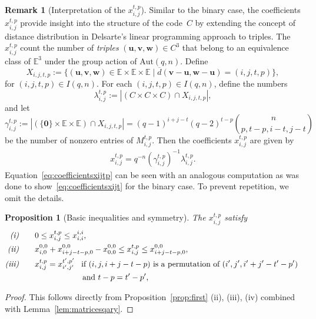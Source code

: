 \documentclass[10pt,a4paper]{article}
\newcommand{\E}{\mathbb{E}}
\newtheorem{proposition}[theorem]{Proposition}
\theoremstyle{definition}
\newtheorem{remark}{Remark}[section]
\newcommand{\uu}{\mathbf{u}}
\newcommand{\vv}{\mathbf{v}}
\newcommand{\ww}{\mathbf{w}}
\begin{document}
\begin{remark}[Interpretation of the $x_{i,j}^{t,p}$]
Similar to the binary case, the coefficients $x_{i,j}^{t,p}$ provide insight into the structure of the code~$C$ by extending the concept of distance distribution in Delsarte's linear programming approach to triples.  The $x_{i,j}^{t,p}$ count the number of \emph{triples} $(\uu, \vv, \ww) \in C^3$ that belong to an equivalence class of $\E^3$ under the group action of $\text{Aut}(q,n)$. 
Define
\[
X_{i,j,t,p} := \{ (\uu, \vv, \ww) \in \E \times \E \times \E \mid \overline{d}( \vv-\uu, \ww-\uu) = (i, j, t,p) \},
\]
for  $(i, j, t,p) \in I(q, n) $. For each $(i, j, t,p) \in I(q, n)$, define the numbers
\[
\lambda_{i,j}^{t,p} := |(C \times C \times C) \cap X_{i,j,t,p}|,
\]
and let
\[
\gamma_{i,j}^{t,p} := |(\{\mathbf{0}\} \times \E \times \E) \cap X_{i,j,t,p}| =(q-1)^{i+j-t} (q-2)^{t-p} \binom{n}{p,t-p, i-t, j-t}
\]
be the number of nonzero entries of $ M_{i,j}^{t,p}$. Then the coefficients $x_{i,j}^{t,p}$ are given by
\begin{align}\label{eq:coefficientsxijtp}
x_{i,j}^{t,p} = q^{-n} (\gamma_{i,j}^{t,p})^{-1} \lambda_{i,j}^{t,p}.
\end{align}
Equation~\eqref{eq:coefficientsxijtp} can be seen with an analogous computation as was done to show~\eqref{eq:coefficientsxijt} for the binary case. To prevent repetition, we omit the details.
\end{remark}




\begin{proposition}[Basic inequalities and symmetry]\label{prop:firstqary}
    The $x_{i,j}^{t,p}$ satisfy 
\begin{align}\label{constraints:qarylinear}
\text{\emph{(i)}}& \quad\quad 0 \leq x_{i,j}^{t,p} \leq x_{i,i}^{i,i}, \\ 
\text{\emph{(ii)}}& \quad\quad x_{i,0}^{0,0} + x^{0,0}_{i+j-t-p,0}-x_{0,0}^{0,0}  \leq x_{i,j}^{t,p}\leq    x^{0,0}_{i+j-t-p,0},\notag \\ 
\text{\emph{(iii)}}&\quad\quad  x_{i,j}^{t,p} = x_{i',j'}^{t',p'} \,\,\,\text{ if $(i,j,i+j-t-p)$ is a permutation of $(i',j',i'+j'-t'-p')$ }\notag\\
& \quad\quad\quad\quad\quad\quad\quad\quad\text{and $t-p=t'-p'$}, \notag 
\end{align}
\end{proposition}
\begin{proof} 
This follows directly from Proposition~\ref{prop:first} (ii), (iii), (iv) combined with Lemma~\ref{lem:matricesqary}.
\end{proof} 
\end{document}
